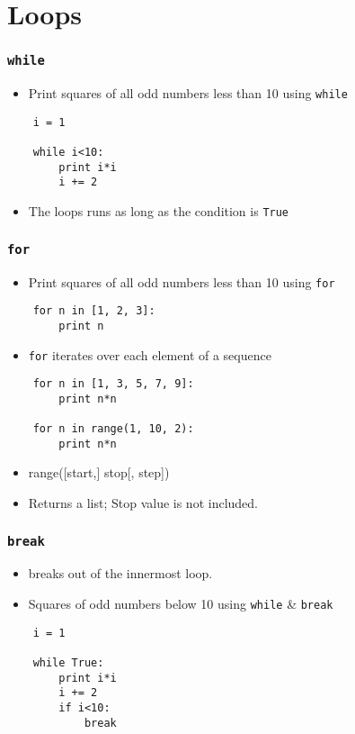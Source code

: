 \section{Loops}

\begin{frame}[fragile]
  \frametitle{\texttt{while}}
  \begin{itemize}
  \item Print squares of all odd numbers less than 10 using
    \texttt{while} 
  \end{itemize}
  \begin{lstlisting}
    i = 1

    while i<10:
        print i*i
        i += 2
  \end{lstlisting}
  \begin{itemize}
  \item The loops runs as long as the condition is \texttt{True}
  \end{itemize}
\end{frame}

\begin{frame}[fragile]
  \frametitle{\texttt{for}}
  \begin{itemize}
  \item Print squares of all odd numbers less than 10 using
    \texttt{for}
  \end{itemize}
  \begin{lstlisting}
    for n in [1, 2, 3]:
        print n
  \end{lstlisting}
  \begin{itemize}
  \item \texttt{for} iterates over each element of a sequence
  \end{itemize}
  \begin{lstlisting}
    for n in [1, 3, 5, 7, 9]: 
        print n*n

    for n in range(1, 10, 2):
        print n*n
  \end{lstlisting}
  \begin{itemize}
  \item \alert{range([start,] stop[, step])}
  \item Returns a list; Stop value is not included. 
  \end{itemize}
\end{frame}


\begin{frame}[fragile]
  \frametitle{\texttt{break}}
  \begin{itemize}
  \item breaks out of the innermost loop.
  \item Squares of odd numbers below 10 using \texttt{while} \&
    \texttt{break}
  \end{itemize}
  \begin{lstlisting}
    i = 1

    while True:
        print i*i
        i += 2
        if i<10:
            break
  \end{lstlisting}
\end{frame}


